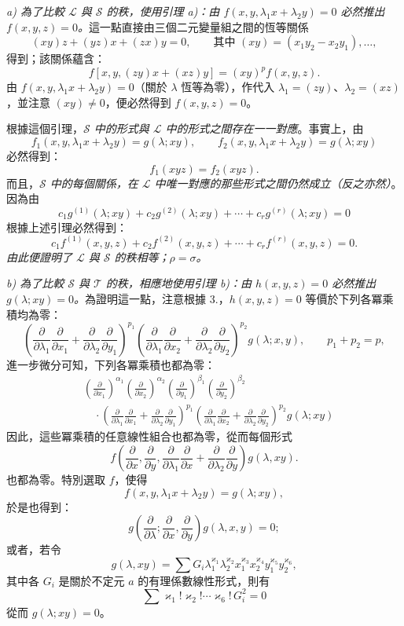 \documentclass[11pt]{article}
\begin{document}
\emph{a) 為了比較 $\mathcal L$ 與 $\mathcal S$ 的秩，使用引理 a)：由 $f(x,y,\lambda_1x+\lambda_2y)=0$ 必然推出 $f(x,y,z)=0$。}這一點直接由三個二元變量組之間的恆等關係
\[
  (xy)z+(yz)x+(zx)y=0,
  \qquad \text{其中 }(xy)=(x_1y_2-x_2y_1),\ldots,
\]
得到；該關係蘊含：
\[
  f[x,y,(zy)x+(xz)y]=(xy)^p f(x,y,z).
\]
由 $f(x,y,\lambda_1x+\lambda_2y)=0$（關於 $\lambda$ 恆等為零），作代入 $\lambda_1=(zy)$、$\lambda_2=(xz)$，並注意 $(xy)\ne0$，便必然得到 $f(x,y,z)=0$。

根據這個引理，\emph{$\mathcal S$ 中的形式與 $\mathcal L$ 中的形式之間存在一一對應}。事實上，由
\[
  f_1(x,y,\lambda_1x+\lambda_2y)=g(\lambda;xy),\qquad
  f_2(x,y,\lambda_1x+\lambda_2y)=g(\lambda;xy)
\]
必然得到：
\[
  f_1(xyz)=f_2(xyz).
\]
而且，\emph{$\mathcal S$ 中的每個關係，在 $\mathcal L$ 中唯一對應的那些形式之間仍然成立（反之亦然）}。因為由
\[
  c_1g^{(1)}(\lambda;xy)+c_2g^{(2)}(\lambda;xy)+\cdots+c_rg^{(r)}(\lambda;xy)=0
\]
根據上述引理必然得到：
\[
  c_1f^{(1)}(x,y,z)+c_2f^{(2)}(x,y,z)+\cdots+c_rf^{(r)}(x,y,z)=0.
\]
\emph{由此便證明了 $\mathcal L$ 與 $\mathcal S$ 的秩相等；$\rho=\sigma$。}

\emph{b) 為了比較 $\mathcal S$ 與 $\mathcal T$ 的秩，相應地使用引理 b)：由 $h(x,y,z)=0$ 必然推出 $g(\lambda;xy)=0$。}為證明這一點，注意根據 3.，$h(x,y,z)=0$ 等價於下列各冪乘積均為零：
\[
 \left(\frac{\partial}{\partial\lambda_1}\frac{\partial}{\partial x_1}
 +\frac{\partial}{\partial\lambda_2}\frac{\partial}{\partial y_1}\right)^{p_1}
 \left(\frac{\partial}{\partial\lambda_1}\frac{\partial}{\partial x_2}
 +\frac{\partial}{\partial\lambda_2}\frac{\partial}{\partial y_2}\right)^{p_2}g(\lambda;x,y),
 \qquad p_1+p_2=p,
\]
進一步微分可知，下列各冪乘積也都為零：
\[
\begin{aligned}
&\left(\frac{\partial}{\partial x_1}\right)^{\alpha_1}
 \left(\frac{\partial}{\partial x_2}\right)^{\alpha_2}
 \left(\frac{\partial}{\partial y_1}\right)^{\beta_1}
 \left(\frac{\partial}{\partial y_2}\right)^{\beta_2} \\
&\quad\cdot
 \left(\frac{\partial}{\partial\lambda_1}\frac{\partial}{\partial x_1}
 +\frac{\partial}{\partial\lambda_2}\frac{\partial}{\partial y_1}\right)^{p_1}
 \left(\frac{\partial}{\partial\lambda_1}\frac{\partial}{\partial x_2}
 +\frac{\partial}{\partial\lambda_2}\frac{\partial}{\partial y_2}\right)^{p_2}
 g(\lambda;xy)
\end{aligned}
\]
因此，這些冪乘積的任意線性組合也都為零，從而每個形式
\[
  f\left(\frac{\partial}{\partial x},\frac{\partial}{\partial y},
  \frac{\partial}{\partial\lambda_1}\frac{\partial}{\partial x}
  +\frac{\partial}{\partial\lambda_2}\frac{\partial}{\partial y}\right)g(\lambda,xy).
\]
也都為零。特別選取 $f$，使得
\[
  f(x,y,\lambda_1x+\lambda_2y)=g(\lambda;xy),
\]
於是也得到：
\[
  g\left(\frac{\partial}{\partial\lambda};
    \frac{\partial}{\partial x},
    \frac{\partial}{\partial y}\right)g(\lambda,x,y)=0;
\]
或者，若令
\[
  g(\lambda,xy)=\sum G_i\lambda_1^{\varkappa_1}\lambda_2^{\varkappa_2}
  x_1^{\varkappa_3}x_2^{\varkappa_4}y_1^{\varkappa_5}y_2^{\varkappa_6},
\]
其中各 $G_i$ 是關於不定元 $a$ 的有理係數線性形式，則有
\[
  \sum \varkappa_1!\varkappa_2!\cdots\varkappa_6!\,G_i^2=0
\]
從而 $g(\lambda;xy)=0$。
\end{document}
